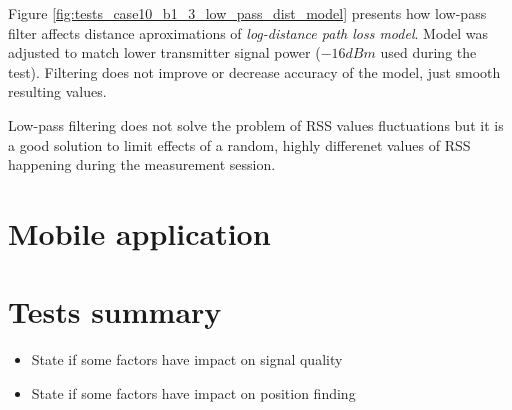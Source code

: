 \documentclass[../main.tex]{subfiles}
\begin{document}
Figure \ref{fig:tests_case10_b1_3_low_pass_dist_model} presents how low-pass filter affects distance aproximations of \textit{log-distance path loss model}. Model was adjusted to match lower transmitter signal power ($-16dBm$ used during the test). Filtering does not improve or decrease accuracy of the model, just smooth resulting values.

Low-pass filtering does not solve the problem of RSS values fluctuations but it is a good solution to limit effects of a random, highly differenet values of RSS happening during the measurement session.

\FloatBarrier

\section{Mobile application} %
\label{sec:mobile_application}


\section{Tests summary} %
\label{sec:tests_summary}
\begin{itemize}
	\item State if some factors have impact on signal quality
	\item State if some factors have impact on position finding
\end{itemize}

\end{document}
